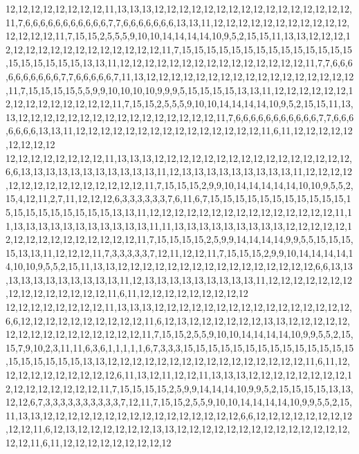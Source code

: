 12,12,12,12,12,12,12,12,11,13,13,13,12,12,12,12,12,12,12,12,12,12,12,12,12,12,12,12,11,7,6,6,6,6,6,6,6,6,6,6,6,7,7,6,6,6,6,6,6,6,13,13,11,12,12,12,12,12,12,12,12,12,12,12,12,12,12,12,11,7,15,15,2,5,5,5,9,10,10,14,14,14,14,10,9,5,2,15,15,11,13,13,12,12,12,12,12,12,12,12,12,12,12,12,12,12,12,12,11,7,15,15,15,15,15,15,15,15,15,15,15,15,15,15,15,15,15,15,15,15,13,13,11,12,12,12,12,12,12,12,12,12,12,12,12,12,12,12,11,7,7,6,6,6,6,6,6,6,6,6,6,7,7,6,6,6,6,6,7,11,13,12,12,12,12,12,12,12,12,12,12,12,12,12,12,12,12,12,11,7,15,15,15,15,5,5,9,9,10,10,10,10,9,9,9,5,15,15,15,15,13,13,11,12,12,12,12,12,12,12,12,12,12,12,12,12,12,12,11,7,15,15,2,5,5,5,9,10,10,14,14,14,14,10,9,5,2,15,15,11,13,13,12,12,12,12,12,12,12,12,12,12,12,12,12,12,12,12,11,7,6,6,6,6,6,6,6,6,6,6,6,7,7,6,6,6,6,6,6,6,13,13,11,12,12,12,12,12,12,12,12,12,12,12,12,12,12,12,11,6,11,12,12,12,12,12,12,12,12,12
12,12,12,12,12,12,12,12,11,13,13,13,12,12,12,12,12,12,12,12,12,12,12,12,12,12,12,12,6,6,13,13,13,13,13,13,13,13,13,13,13,11,12,13,13,13,13,13,13,13,13,13,11,12,12,12,12,12,12,12,12,12,12,12,12,12,12,12,11,7,15,15,15,2,9,9,10,14,14,14,14,14,10,10,9,5,5,2,15,4,12,11,2,7,11,12,12,12,6,3,3,3,3,3,3,7,6,11,6,7,15,15,15,15,15,15,15,15,15,15,15,15,15,15,15,15,15,15,15,15,13,13,11,12,12,12,12,12,12,12,12,12,12,12,12,12,12,12,11,11,13,13,13,13,13,13,13,13,13,13,13,11,11,13,13,13,13,13,13,13,13,13,12,12,12,12,12,12,12,12,12,12,12,12,12,12,12,12,11,7,15,15,15,15,2,5,9,9,14,14,14,14,9,9,5,5,15,15,15,15,13,13,11,12,12,12,11,7,3,3,3,3,3,7,12,11,12,12,11,7,15,15,15,2,9,9,10,14,14,14,14,14,10,10,9,5,5,2,15,11,13,13,12,12,12,12,12,12,12,12,12,12,12,12,12,12,12,12,6,6,13,13,13,13,13,13,13,13,13,13,13,11,12,13,13,13,13,13,13,13,13,13,11,12,12,12,12,12,12,12,12,12,12,12,12,12,12,12,11,6,11,12,12,12,12,12,12,12,12,12
12,12,12,12,12,12,12,12,11,13,13,13,12,12,12,12,12,12,12,12,12,12,12,12,12,12,12,12,6,6,12,12,12,12,12,12,12,12,12,12,11,6,12,13,12,12,12,12,12,12,13,13,12,12,12,12,12,12,12,12,12,12,12,12,12,12,12,12,11,7,15,15,2,5,5,9,10,10,14,14,14,14,10,9,9,5,5,2,15,15,7,9,10,2,3,11,11,6,3,6,1,1,1,1,1,6,7,3,3,3,15,15,15,15,15,15,15,15,15,15,15,15,15,15,15,15,15,15,15,15,13,13,12,12,12,12,12,12,12,12,12,12,12,12,12,12,12,12,11,6,11,12,12,12,12,12,12,12,12,12,12,6,11,13,12,11,12,12,11,13,13,13,12,12,12,12,12,12,12,12,12,12,12,12,12,12,12,12,11,7,15,15,15,15,2,5,9,9,14,14,14,10,9,9,5,2,15,15,15,15,13,13,12,12,6,7,3,3,3,3,3,3,3,3,3,3,7,12,11,7,15,15,2,5,5,9,10,10,14,14,14,14,10,9,9,5,5,2,15,11,13,13,12,12,12,12,12,12,12,12,12,12,12,12,12,12,12,12,6,6,12,12,12,12,12,12,12,12,12,12,11,6,12,13,12,12,12,12,12,12,13,13,12,12,12,12,12,12,12,12,12,12,12,12,12,12,12,12,11,6,11,12,12,12,12,12,12,12,12,12
